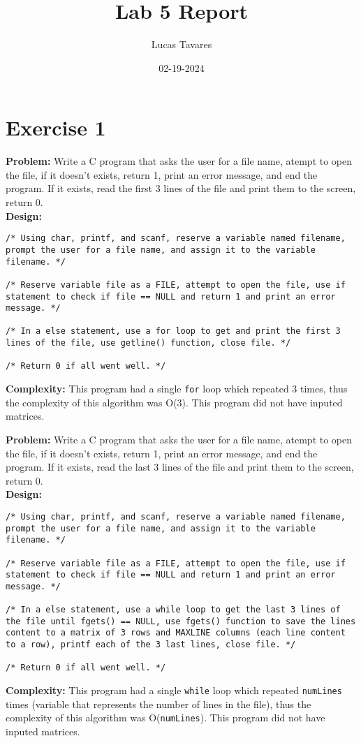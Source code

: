 \documentclass{article}
\title{Lab 5 Report}
\date{02-19-2024}
\author{Lucas Tavares}
\begin{document}
\maketitle


\newpage

\section{Exercise 1}

\textbf{Problem:} Write a C program that asks the user for a file name, atempt to open the file, if it doesn't exists, return 1, print an error message, and end the program. If it exists, read the first 3 lines of the file and print them to the screen, return 0. \\

\textbf{Design:}
\begin{lstlisting}[numbers=none]
/* Using char, printf, and scanf, reserve a variable named filename, prompt the user for a file name, and assign it to the variable filename. */

/* Reserve variable file as a FILE, attempt to open the file, use if statement to check if file == NULL and return 1 and print an error message. */

/* In a else statement, use a for loop to get and print the first 3 lines of the file, use getline() function, close file. */

/* Return 0 if all went well. */
\end{lstlisting}
\hfill \break
\textbf{Complexity:} This program had a single \texttt{for} loop which repeated 3 times, thus the complexity of this algorithm was O(3). This program did not have inputed matrices.


\newpage

\textbf{Problem:} Write a C program that asks the user for a file name, atempt to open the file, if it doesn't exists, return 1, print an error message, and end the program. If it exists, read the last 3 lines of the file and print them to the screen, return 0. \\

\textbf{Design:} 
\begin{lstlisting}[numbers=none]
/* Using char, printf, and scanf, reserve a variable named filename, prompt the user for a file name, and assign it to the variable filename. */

/* Reserve variable file as a FILE, attempt to open the file, use if statement to check if file == NULL and return 1 and print an error message. */

/* In a else statement, use a while loop to get the last 3 lines of the file until fgets() == NULL, use fgets() function to save the lines content to a matrix of 3 rows and MAXLINE columns (each line content to a row), printf each of the 3 last lines, close file. */

/* Return 0 if all went well. */
\end{lstlisting}
\hfill \break
\textbf{Complexity:} This program had a single \texttt{while} loop which repeated \texttt{numLines} times (variable that represents the number of lines in the file), thus the complexity of this algorithm was O(\texttt{numLines}). This program did not have inputed matrices.
\end{document}
